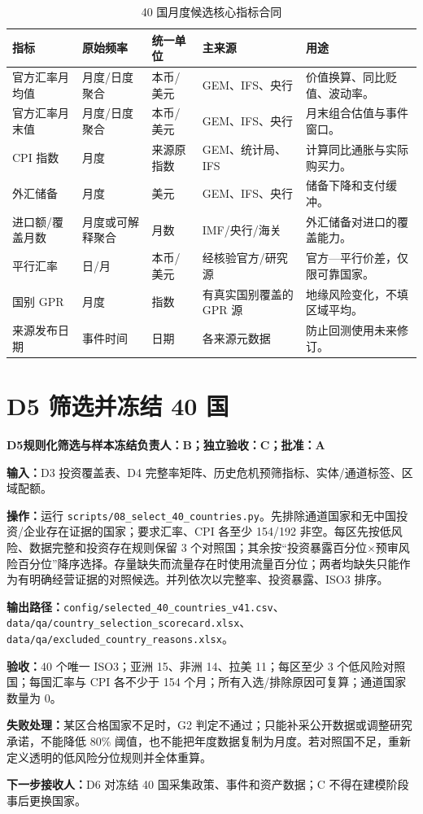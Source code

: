 \documentclass[UTF8,fontset=windows,12pt,openany]{ctexbook}
\newcommand{\File}[1]{{\small\begingroup\urlstyle{same}\nolinkurl{#1}\endgroup}}
\newcommand{\StepTitle}[3]{%
  \noindent\colorbox{DeepNavy}{\parbox{0.965\textwidth}{\color{white}\Large\bfseries #1\quad #2\hfill\normalsize #3}}\par\medskip
}
\newcommand{\CardRow}[2]{\noindent\textbf{#1：}#2\par}
\begin{document}
\begin{longtable}{p{3.2cm}p{2.6cm}p{2.5cm}p{2.4cm}p{3.1cm}}
\caption{40 国月度候选核心指标合同}\label{tab:monthly-core}\\
\toprule
\textbf{指标} & \textbf{原始频率} & \textbf{统一单位} & \textbf{主来源} & \textbf{用途}\\
\midrule
官方汇率月均值 & 月度/日度聚合 & 本币/美元 & GEM、IFS、央行 & 价值换算、同比贬值、波动率。\\
官方汇率月末值 & 月度/日度聚合 & 本币/美元 & GEM、IFS、央行 & 月末组合估值与事件窗口。\\
CPI 指数 & 月度 & 来源原指数 & GEM、统计局、IFS & 计算同比通胀与实际购买力。\\
外汇储备 & 月度 & 美元 & GEM、IFS、央行 & 储备下降和支付缓冲。\\
进口额/覆盖月数 & 月度或可解释聚合 & 月数 & IMF/央行/海关 & 外汇储备对进口的覆盖能力。\\
平行汇率 & 日/月 & 本币/美元 & 经核验官方/研究源 & 官方—平行价差，仅限可靠国家。\\
国别 GPR & 月度 & 指数 & 有真实国别覆盖的 GPR 源 & 地缘风险变化，不填区域平均。\\
来源发布日期 & 事件时间 & 日期 & 各来源元数据 & 防止回测使用未来修订。\\
\bottomrule
\end{longtable}

\newpage
\section{D5 筛选并冻结 40 国}
\StepTitle{D5}{规则化筛选与样本冻结}{负责人：B；独立验收：C；批准：A}
\CardRow{输入}{D3 投资覆盖表、D4 完整率矩阵、历史危机预筛指标、实体/通道标签、区域配额。}
\CardRow{操作}{运行 \File{scripts/08_select_40_countries.py}。先排除通道国家和无中国投资/企业存在证据的国家；要求汇率、CPI 各至少 154/192 非空。每区先按低风险、数据完整和投资存在规则保留 3 个对照国；其余按“投资暴露百分位×预审风险百分位”降序选择。存量缺失而流量存在时使用流量百分位；两者均缺失只能作为有明确经营证据的对照候选。并列依次以完整率、投资暴露、ISO3 排序。}
\CardRow{输出路径}{\File{config/selected_40_countries_v41.csv}、\File{data/qa/country_selection_scorecard.xlsx}、\File{data/qa/excluded_country_reasons.xlsx}。}
\CardRow{验收}{40 个唯一 ISO3；亚洲 15、非洲 14、拉美 11；每区至少 3 个低风险对照国；每国汇率与 CPI 各不少于 154 个月；所有入选/排除原因可复算；通道国家数量为 0。}
\CardRow{失败处理}{某区合格国家不足时，G2 判定不通过；只能补采公开数据或调整研究承诺，不能降低 80\% 阈值，也不能把年度数据复制为月度。若对照国不足，重新定义透明的低风险分位规则并全体重算。}
\CardRow{下一步接收人}{D6 对冻结 40 国采集政策、事件和资产数据；C 不得在建模阶段事后更换国家。}
\end{document}
